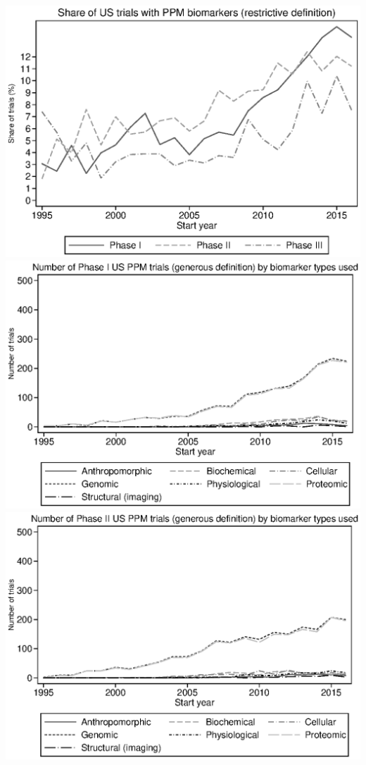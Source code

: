 \includegraphics{../figures/A03d-r_ppm_share_by_phase_us.eps}
\includegraphics{../figures/A04a-trial_count_by_type_g_ppm_phase_1_us.eps}
\includegraphics{../figures/A04b-trial_count_by_type_g_ppm_phase_2_us.eps}

